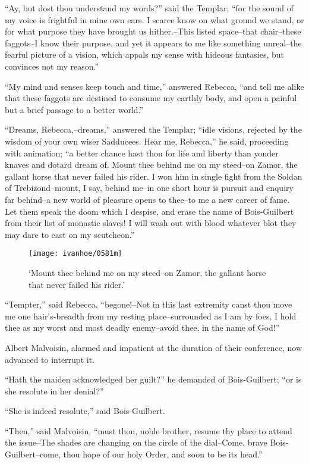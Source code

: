 ``Ay, but dost thou understand my words?'' said the Templar; ``for the
sound of my voice is frightful in mine own ears. I scarce know on what
ground we stand, or for what purpose they have brought us hither.--This
listed space--that chair--these faggots--I know their purpose, and yet
it appears to me like something unreal--the fearful picture of a vision,
which appals my sense with hideous fantasies, but convinces not my
reason.''

``My mind and senses keep touch and time,'' answered Rebecca, ``and tell
me alike that these faggots are destined to consume my earthly body, and
open a painful but a brief passage to a better world.''

``Dreams, Rebecca,--dreams,'' answered the Templar; ``idle visions,
rejected by the wisdom of your own wiser Sadducees. Hear me, Rebecca,''
he said, proceeding with animation; ``a better chance hast thou for life
and liberty than yonder knaves and dotard dream of. Mount thee behind me
on my steed--on Zamor, the gallant horse that never failed his rider. I
won him in single fight from the Soldan of Trebizond--mount, I say,
behind me--in one short hour is pursuit and enquiry far behind--a new
world of pleasure opens to thee--to me a new career of fame. Let them
speak the doom which I despise, and erase the name of Bois-Guilbert from
their list of monastic slaves! I will wash out with blood whatever blot
they may dare to cast on my scutcheon.''

\begin{figure}
    \centering
    \texttt{[image: ivanhoe/0581m]}
    \caption{`Mount thee behind me on my steed--on Zamor, the gallant
    horse that never failed his rider.'}
\end{figure}

``Tempter,'' said Rebecca, ``begone!--Not in this last extremity canst
thou move me one hair's-breadth from my resting place--surrounded as I
am by foes, I hold thee as my worst and most deadly enemy--avoid thee,
in the name of God!''

Albert Malvoisin, alarmed and impatient at the duration of their
conference, now advanced to interrupt it.

``Hath the maiden acknowledged her guilt?'' he demanded of
Bois-Guilbert; ``or is she resolute in her denial?''

``She is indeed resolute,'' said Bois-Guilbert.

``Then,'' said Malvoisin, ``must thou, noble brother, resume thy place
to attend the issue--The shades are changing on the circle of the
dial--Come, brave Bois-Guilbert--come, thou hope of our holy Order, and
soon to be its head.''


